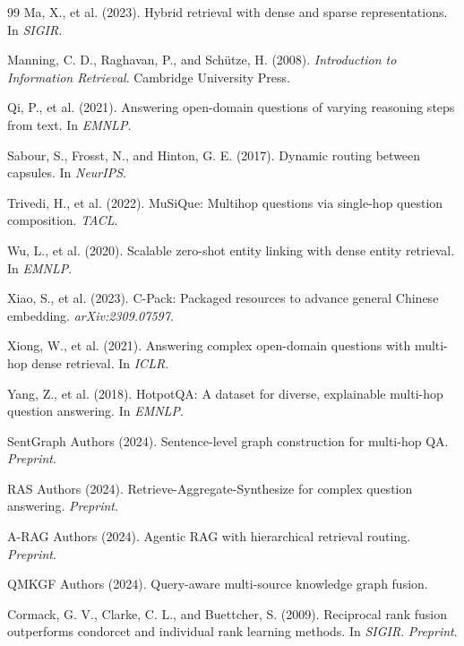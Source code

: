\documentclass[11pt,a4paper]{article}
\begin{document}
\begin{thebibliography}{99}
Ma, X., et al. (2023).
Hybrid retrieval with dense and sparse representations.
In \textit{SIGIR}.

Manning, C. D., Raghavan, P., and Schütze, H. (2008).
\textit{Introduction to Information Retrieval}.
Cambridge University Press.

Qi, P., et al. (2021).
Answering open-domain questions of varying reasoning steps from text.
In \textit{EMNLP}.

Sabour, S., Frosst, N., and Hinton, G. E. (2017).
Dynamic routing between capsules.
In \textit{NeurIPS}.

Trivedi, H., et al. (2022).
MuSiQue: Multihop questions via single-hop question composition.
\textit{TACL}.

Wu, L., et al. (2020).
Scalable zero-shot entity linking with dense entity retrieval.
In \textit{EMNLP}.

Xiao, S., et al. (2023).
C-Pack: Packaged resources to advance general Chinese embedding.
\textit{arXiv:2309.07597}.

Xiong, W., et al. (2021).
Answering complex open-domain questions with multi-hop dense retrieval.
In \textit{ICLR}.

Yang, Z., et al. (2018).
HotpotQA: A dataset for diverse, explainable multi-hop question answering.
In \textit{EMNLP}.

SentGraph Authors (2024).
Sentence-level graph construction for multi-hop QA.
\textit{Preprint}.

RAS Authors (2024).
Retrieve-Aggregate-Synthesize for complex question answering.
\textit{Preprint}.

A-RAG Authors (2024).
Agentic RAG with hierarchical retrieval routing.
\textit{Preprint}.

QMKGF Authors (2024).
Query-aware multi-source knowledge graph fusion.

Cormack, G. V., Clarke, C. L., and Buettcher, S. (2009).
Reciprocal rank fusion outperforms condorcet and individual rank learning methods.
In \textit{SIGIR}.
\textit{Preprint}.


\end{thebibliography}
\end{document}
